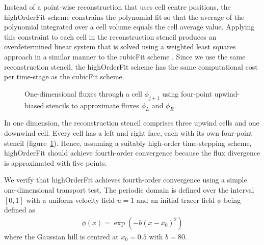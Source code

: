 \documentclass[a4paper,11pt]{article}
\begin{document}
Instead of a point-wise reconstruction that uses cell centre positions, the highOrderFit scheme constrains the polynomial fit so that the average of the polynomial integrated over a cell volume equals the cell average value.
Applying this constraint to each cell in the reconstruction stencil produces an overdetermined linear system that is solved using a weighted least squares approach in a similar manner to the cubicFit scheme \citep{shaw2017}.
Since we use the same reconstruction stencil, the highOrderFit scheme has the same computational cost per time-stage as the cubicFit scheme.

\begin{figure}
	\centering
	\caption{One-dimensional fluxes through a cell $\phi_{j+1}$ using four-point upwind-biased stencils to approximate fluxes $\phi_L$ and $\phi_R$.}
	\label{fig:1d-stencil}
\end{figure}

In one dimension, the reconstruction stencil comprises three upwind cells and one downwind cell.
Every cell has a left and right face, each with its own four-point stencil (figure~\ref{fig:1d-stencil}).
Hence, assuming a suitably high-order time-stepping scheme, highOrderFit should achieve fourth-order convergence because the flux divergence is approximated with five points.

We verify that highOrderFit achieves fourth-order convergence using a simple one-dimensional transport test.  The periodic domain is defined over the interval $[0,1]$ with a uniform velocity field $u = 1$ and an initial tracer field $\phi$ being defined as
\begin{align}
	\phi(x) = \exp \left( -b \left( x - x_0 \right)^2 \right)
\end{align}
where the Gaussian hill is centred at $x_0 = 0.5$ with $b = 80$.
\end{document}
